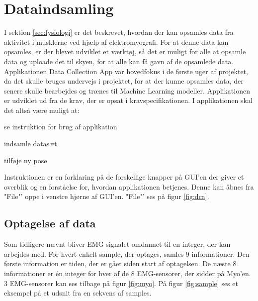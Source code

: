 \thispagestyle{fancy}
\chapter{Dataindsamling}
\label{chp:dataingsamlingChapter}
I sektion \ref{sec:fysiologi} er det beskrevet, hvordan der kan opsamles data fra aktivitet i musklerne ved hjælp af elektromyografi. For at denne data kan opsamles, er der blevet udviklet et værktøj, så det er muligt for alle at opsamle data og uploade det til skyen, for at alle kan få gavn af de opsamlede data. Applikationen Data Collection App var hovedfokus i de første uger af projektet, da det skulle bruges undervejs i projektet, for at der kunne opsamles data, der senere skulle bearbejdes og trænes til Machine Learning modeller. Applikationen er udviklet ud fra de krav, der er opsat i kravspecifikationen\citep{RefWorks:8}. I applikationen skal det altså være muligt at:
\begin{myItemize}
	\item se instruktion for brug af applikation
	\item indsamle datasæt
	\item tilføje ny pose
\end{myItemize}
Instruktionen er en forklaring på de forskellige knapper på GUI'en der giver et overblik og en forståelse for, hvordan applikationen betjenes. Denne kan åbnes fra "File"' oppe i venstre hjørne af GUI'en. "File"' ses på figur \ref{fig:dca}.

\section{Optagelse af data}
\label{sec:optagelsedata}
Som tidligere nævnt bliver EMG signalet omdannet til en integer, der kan arbejdes med. For hvert enkelt sample, der optages, samles 9 informationer. Den første information er tiden, der er gået siden start af optagelsen. De næste 8 informationer er én integer for hver af de 8 EMG-sensorer, der sidder på Myo'en. 3 EMG-sensorer kan ses tilbage på figur \ref{fig:myo}.
På figur \ref{fig:sample} ses et eksempel på et udsnit fra en sekvens af samples.


